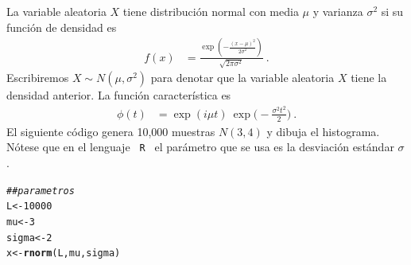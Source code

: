 \documentclass[12pt,reqno]{amsart}\usepackage[]{graphicx}\usepackage[]{color}
\makeatletter
\newcommand{\hlnum}[1]{\textcolor[rgb]{0.686,0.059,0.569}{#1}}%
\newcommand{\hlcom}[1]{\textcolor[rgb]{0.678,0.584,0.686}{\textit{#1}}}%
\newcommand{\hlstd}[1]{\textcolor[rgb]{0.345,0.345,0.345}{#1}}%
\newcommand{\hlkwb}[1]{\textcolor[rgb]{0.69,0.353,0.396}{#1}}%
\newcommand{\hlkwd}[1]{\textcolor[rgb]{0.737,0.353,0.396}{\textbf{#1}}}%
\newenvironment{kframe}{%
 \def\at@end@of@kframe{}%
 \ifinner\ifhmode%
  \def\at@end@of@kframe{\end{minipage}}%
  \begin{minipage}{\columnwidth}%
 \fi\fi%
 \def\FrameCommand##1{\hskip\@totalleftmargin \hskip-\fboxsep
 \colorbox{shadecolor}{##1}\hskip-\fboxsep
     \hskip-\linewidth \hskip-\@totalleftmargin \hskip\columnwidth}%
 \MakeFramed {\advance\hsize-\width
   \@totalleftmargin\z@ \linewidth\hsize
   \@setminipage}}%
 {\par\unskip\endMakeFramed%
 \at@end@of@kframe}
\newenvironment{knitrout}{}{} %
\makeatother
\begin{document}
La variable aleatoria $X$ tiene distribución normal con media $\mu$ y varianza $\sigma^2$ si su función de densidad es 
\begin{equation}\label{denNormal}
  \begin{split}
  f(x) &= \frac{\exp(-\frac{(x-\mu)^2}{2 \sigma^2})}{\sqrt{2 \pi \sigma^2}}\:.
  \end{split}
\end{equation}
Escribiremos $X \sim N(\mu,\sigma^2)$ para denotar que la variable aleatoria $X$ tiene la densidad anterior. La función característica es
\begin{equation}\label{caracterNormal}
  \begin{split}
  \phi(t) &= \exp(i\mu t)\:\exp\biggl(-\frac{\sigma^2 t^2}{2}\biggr) \:.
  \end{split}
\end{equation}
El siguiente código genera 10,000 muestras $N(3,4)$ y dibuja el histograma. Nótese que en el lenguaje \verb+ R + el parámetro que se usa es la desviación estándar $\sigma$.
\begin{knitrout}
\color{fgcolor}\begin{kframe}
\begin{alltt}
\hlcom{## parametros}
\hlstd{L} \hlkwb{<-} \hlnum{10000}
\hlstd{mu} \hlkwb{<-} \hlnum{3}
\hlstd{sigma} \hlkwb{<-} \hlnum{2}
\hlstd{x} \hlkwb{<-} \hlkwd{rnorm}\hlstd{(L, mu, sigma)}
\end{alltt}
\end{kframe}
\end{knitrout}
\end{document}
